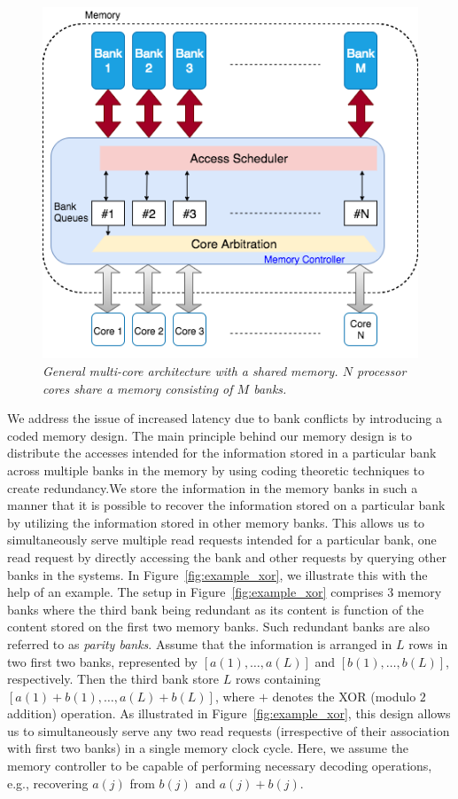 \begin{figure}[t!]
\centering
\includegraphics[width=\linewidth]{fig/fig-2-memory-controller.png}
\caption{\it{General multi-core architecture with a shared memory. $N$ processor cores share a memory consisting of $M$ banks.}}
\label{fig:multicore_arch}
\end{figure}
We address the issue of increased latency due to bank conflicts by introducing a coded memory design. The main principle behind our memory design is to distribute the accesses intended for the information stored in a particular bank across multiple banks in the memory by using coding theoretic techniques to create redundancy.We store the information in the memory banks in such a manner that it is possible to recover the information stored on a particular bank by utilizing the information stored in other memory banks. This allows us to simultaneously serve multiple read requests intended for a particular bank, one read request by directly accessing the bank and other requests by querying other banks in the systems. In Figure~\ref{fig:example_xor}, we illustrate this with the help of an example. The setup in Figure~\ref{fig:example_xor} comprises $3$ memory banks where the third bank being redundant as its content is function of the content stored on the first two memory banks. Such redundant banks are also referred to as {\em parity banks}. Assume that the information is arranged in $L$ rows in two first two banks, represented by $[a(1),\ldots, a(L)]$ and $[b(1),\ldots, b(L)]$, respectively. Then the third bank store $L$ rows containing $[a(1) + b(1),\ldots, a(L) + b(L)]$, where $+$ denotes the XOR (modulo $2$ addition) operation. As illustrated in Figure~\ref{fig:example_xor}, this design allows us to simultaneously serve any two read requests (irrespective of their association with first two banks) in a single memory clock cycle. Here, we assume the memory controller to be capable of performing necessary decoding operations, e.g., recovering $a(j)$ from $b(j)$ and $a(j) + b(j)$.

